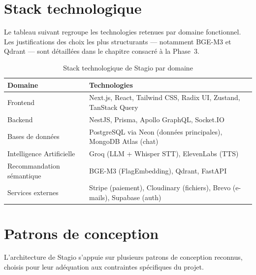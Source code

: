 ﻿\documentclass[12pt,a4paper]{report}
\begin{document}
\section{Stack technologique}

Le tableau suivant regroupe les technologies retenues par domaine fonctionnel. Les justifications des choix les plus structurants — notamment BGE-M3 et Qdrant — sont détaillées dans le chapitre consacré à la Phase~3.

\begin{table}[H]
\centering
\begin{tabularx}{\textwidth}{lX}
\toprule
\textbf{Domaine} & \textbf{Technologies} \\
\midrule
Frontend & Next.js, React, Tailwind CSS, Radix UI, Zustand, TanStack Query \\
Backend & NestJS, Prisma, Apollo GraphQL, Socket.IO \\
Bases de données & PostgreSQL via Neon (données principales), MongoDB Atlas (chat) \\
Intelligence Artificielle & Groq (LLM + Whisper STT), ElevenLabs (TTS) \\
Recommandation sémantique & BGE-M3 (FlagEmbedding), Qdrant, FastAPI \\
Services externes & Stripe (paiement), Cloudinary (fichiers), Brevo (e-mails), Supabase (auth) \\
\bottomrule
\end{tabularx}
\caption{Stack technologique de Stagio par domaine}
\end{table}

\section{Patrons de conception}

L'architecture de Stagio s'appuie sur plusieurs patrons de conception reconnus, choisis pour leur adéquation aux contraintes spécifiques du projet.
\end{document}
